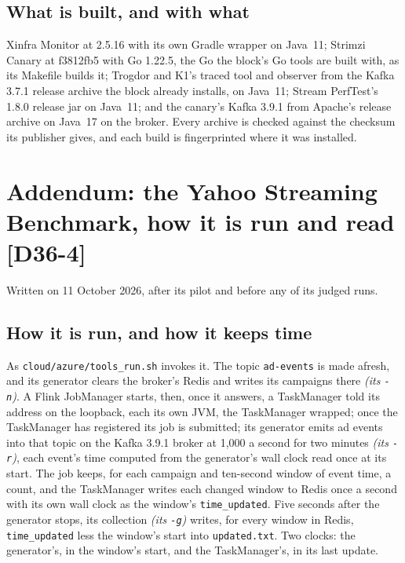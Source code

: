 \documentclass[11pt]{article}
\newcommand{\gl}[1]{{\color{soft}\itshape\small (#1)}}
\newcommand{\chgold}[1]{\,{\color{oldcol}\bfseries\footnotesize[#1]}}
\begin{document}
\subsection*{What is built, and with what}
Xinfra Monitor at 2.5.16 with its own Gradle wrapper on Java~11; Strimzi Canary at f3812fb5 with Go
1.22.5, the Go the block's Go tools are built with, as its Makefile builds it; Trogdor and K1's
traced tool and observer from the Kafka 3.7.1 release archive the block already installs, on
Java~11; Stream PerfTest's 1.8.0 release jar on Java~11; and the canary's Kafka 3.9.1 from Apache's
release archive on Java~17 on the broker. Every archive is checked against the checksum its
publisher gives, and each build is fingerprinted where it was installed.

\section[Addendum: the Yahoo Streaming Benchmark]{Addendum: the Yahoo Streaming Benchmark, how it is run and read\protect\chgold{D36-4}}\label{sec:addendum-ysb}
Written on 11 October 2026, after its pilot and before any of its judged runs.

\subsection*{How it is run, and how it keeps time}
As \texttt{cloud/azure/tools\_run.sh} invokes it. The topic \texttt{ad-events} is made afresh, and
its generator clears the broker's Redis and writes its campaigns there \gl{its \texttt{-n}}. A Flink
JobManager starts, then, once it answers, a TaskManager told its address on the loopback, each its
own JVM, the TaskManager wrapped; once the TaskManager has registered its job is submitted; its
generator emits ad events into that topic on the Kafka 3.9.1 broker at 1,000 a second for two
minutes \gl{its \texttt{-r}}, each
event's time computed from the generator's wall clock read once at its start. The job keeps, for
each campaign and ten-second window of event time, a count, and the TaskManager writes each changed
window to Redis once a second with its own wall clock as the window's \texttt{time\_updated}. Five
seconds after the generator stops, its collection \gl{its \texttt{-g}} writes, for every window in
Redis, \texttt{time\_updated} less the window's start into \texttt{updated.txt}. Two clocks: the
generator's, in the window's start, and the TaskManager's, in its last update.
\end{document}
